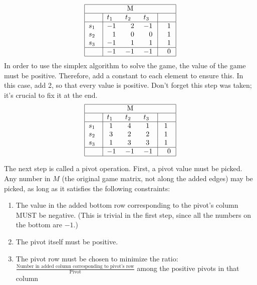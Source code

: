 \documentclass[11pt]{article}
\begin{document}
\begin{equation*}
\begin{tabular}{ |p{0.5cm}|p{0.5cm} p{0.5cm} p{0.5cm}|p{0.5cm}| }
\hline
\multicolumn{5}{|c|}{M} \\
\hline
\textcolor{white}{.}& $t_1$ & $t_2$ & $t_3$ & $\textcolor{white}{-}$\\
\hline
$s_1$ & $-1$ & $\textcolor{white}{-}$2 & $-1$ & $\textcolor{white}{-}$1\\
$s_2$ & $\textcolor{white}{-}$1 & $\textcolor{white}{-}$0 & $\textcolor{white}{-}$0 & $\textcolor{white}{-}$1\\
$s_3$ & $-1$ & $\textcolor{white}{-}$1 & $\textcolor{white}{-}$1 & $\textcolor{white}{-}$1\\
\hline
$\textcolor{white}{-}$ & $-1$ & $-1$ & $-1$ & $\textcolor{white}{-}$0\\
\hline
\end{tabular}
\end{equation*}
In order to use the simplex algorithm to solve the game, the value of
the game must be positive. Therefore, add a constant to each element to
ensure this. In this case, add 2, so that every value is
positive. Don't forget this step was taken; it's crucial to fix it at
the end.
\begin{equation*}
\begin{tabular}{ |p{0.5cm}|p{0.5cm} p{0.5cm} p{0.5cm}|p{0.5cm}| }
\hline
\multicolumn{5}{|c|}{M} \\
\hline
\textcolor{white}{.}& $t_1$ & $t_2$ & $t_3$ & \textcolor{white}{-}\\
\hline
$s_1$ & \textcolor{white}{-}1 & \textcolor{white}{-}4 & \textcolor{white}{-}1 & \textcolor{white}{-}1\\
$s_2$ & \textcolor{white}{-}3 & \textcolor{white}{-}2 & \textcolor{white}{-}2 & \textcolor{white}{-}1\\
$s_3$ & \textcolor{white}{-}1 & \textcolor{white}{-}3 & \textcolor{white}{-}3 & \textcolor{white}{-}1\\
\hline
\textcolor{white}{-} & $-1$ & $-1$ & $-1$ & $\textcolor{white}{-}$0\\
\hline
\end{tabular}
\end{equation*}

The next step is called a pivot operation. First, a pivot value must be
picked. Any number in $M$ (the original game matrix, not along the
added edges) may be picked, as long as it satisfies the following
constraints:
\begin{enumerate}
\item The value in the added bottom row corresponding to the pivot's
column MUST be negative. (This is trivial in the first step, since
all the numbers on the bottom are $-1$.)
\item The pivot itself must be positive.
\item The pivot row must be chosen to minimize the ratio:
$\frac{\text{Number in added column corresponding to pivot's row}}{\text{Pivot}}$
among the positive pivots in that column
\end{enumerate}
\end{document}
